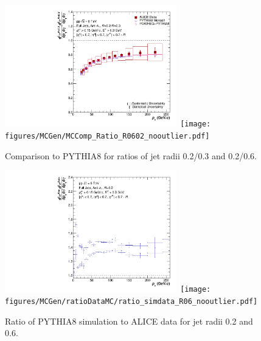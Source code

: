 \documentclass[ALICE]{ALICE_analysis_notes}
\begin{document}
\begin{figure}
    \centering
    \begin{multicols}{2}
            \includegraphics[width=7.5cm]{figures/MCGen/MCComp_Ratio_R0302_nooutlier.pdf}
        \vfill\null
        \columnbreak
            \texttt{[image: figures/MCGen/MCComp\_Ratio\_R0602\_nooutlier.pdf]}
        \vfill\null
    \end{multicols}
    \caption{Comparison to PYTHIA8 for ratios of jet radii 0.2/0.3 and 0.2/0.6.}
    \label{fig:MCGen_Ratio}
\end{figure}

\begin{figure}
    \centering
    \begin{multicols}{2}
            \includegraphics[width=7.5cm]{figures/MCGen/ratioDataMC/ratio_simdata_R02_nooutlier.pdf}
        \vfill\null
        \columnbreak
            \texttt{[image: figures/MCGen/ratioDataMC/ratio\_simdata\_R06\_nooutlier.pdf]}
        \vfill\null
    \end{multicols}
    \caption{Ratio of PYTHIA8 simulation to ALICE data for jet radii 0.2 and 0.6.}
    \label{fig:MCGen_RatioDataMC}
\end{figure}\clearpage{}
\end{document}
